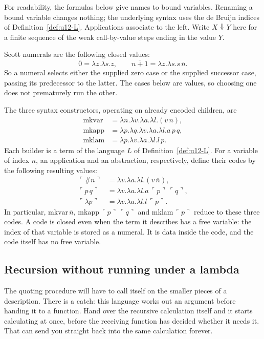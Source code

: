 \documentclass[11pt,twoside]{article}
\theoremstyle{thielethm}
\theoremstyle{thieledef}
\theoremstyle{thieledef}
\theoremstyle{thieledef}
\theoremstyle{thielethm}
\theoremstyle{thieleobs}
\theoremstyle{thielethm}
\begin{document}
For readability, the formulas below give names to bound variables. Renaming a bound
variable changes nothing; the underlying syntax uses the de Bruijn indices of
Definition~\ref{def:u12-L}. Applications associate to the left. Write $X\Downarrow Y$
here for a finite sequence of the weak call-by-value steps ending in the value $Y$.

Scott numerals are the following closed values:
\[
\overline{0}=\lambda z.\lambda s.z,
\qquad
\overline{n+1}=\lambda z.\lambda s.s\,\overline n.
\]
So a numeral selects either the supplied zero case or the supplied successor case,
passing its predecessor to the latter. The cases below are values, so choosing one
does not prematurely run the other.

The three syntax constructors, operating on already encoded children, are
\[
\begin{aligned}
\mathrm{mkvar}&=\lambda n.\lambda v.\lambda a.\lambda l.(v\,n),\\
\mathrm{mkapp}&=\lambda p.\lambda q.\lambda v.\lambda a.\lambda l.a\,p\,q,\\
\mathrm{mklam}&=\lambda p.\lambda v.\lambda a.\lambda l.l\,p.
\end{aligned}
\]
Each builder is a term of the language $L$ of Definition~\ref{def:u12-L}.
For a variable of index $n$, an application and an abstraction, respectively, define
their codes by the following resulting values:
\[
\begin{aligned}
\ulcorner\#n\urcorner&=\lambda v.\lambda a.\lambda l.(v\,\overline n),\\
\ulcorner p\,q\urcorner&=\lambda v.\lambda a.\lambda l.a\,\ulcorner p\urcorner\,\ulcorner q\urcorner,\\
\ulcorner\lambda p\urcorner&=\lambda v.\lambda a.\lambda l.l\,\ulcorner p\urcorner.
\end{aligned}
\]
In particular, $\mathrm{mkvar}\,\overline n$, $\mathrm{mkapp}\,\ulcorner p\urcorner\,\ulcorner q\urcorner$ and
$\mathrm{mklam}\,\ulcorner p\urcorner$ reduce to these three codes. A code is closed even when
the term it describes has a free variable: the index of that variable is stored
as a numeral. It is data inside the code, and the code itself has no free variable.

\subsection{Recursion without running under a lambda}

The quoting procedure will have to call itself on the smaller pieces of a
description. There is a catch: this language works out an argument before
handing it to a function. Hand over the recursive calculation itself and it
starts calculating at once, before the receiving function has decided whether
it needs it. That can send you straight back into the same calculation forever.
\end{document}
